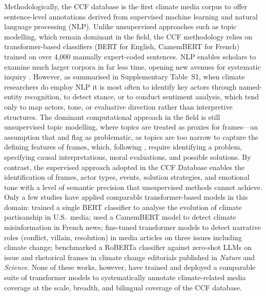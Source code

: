 \documentclass[12pt]{article}
\renewcommand\_{\texttt{\detokenize{_}\allowbreak}}
\begin{document}
Methodologically, the CCF database is the first climate media corpus to offer sentence-level annotations derived from supervised machine learning and natural language processing (NLP). Unlike unsupervised approaches such as topic modelling, which remain dominant in the field, the CCF methodology relies on transformer-based classifiers (BERT for English, CamemBERT for French) trained on over 4,000 manually expert-coded sentences. NLP enables scholars to examine much larger corpora in far less time, opening new avenues for systematic inquiry \autocite{swarnakar_nlp_2021, schafer_computational_2023, hirsbrunner_computational_2024}. However, as summarised in Supplementary Table~S1, when climate researchers do employ NLP it is most often to identify key actors through named-entity recognition, to detect stance, or to conduct sentiment analysis, which tend only to map actors, tone, or evaluative direction rather than interpretive structures. The dominant computational approach in the field is still unsupervised topic modelling, where topics are treated as proxies for frames---an assumption that \textcite{nicholls_computational_2024} and \textcite{otmakhova_media_2024} flag as problematic, as topics are too narrow to capture the defining features of frames, which, following \textcite{entman_framing_1993}, require identifying a problem, specifying causal interpretations, moral evaluations, and possible solutions. By contrast, the supervised approach adopted in the CCF Database enables the identification of frames, actor types, events, solution strategies, and emotional tone with a level of semantic precision that unsupervised methods cannot achieve. Only a few studies have applied comparable transformer-based models in this domain: \textcite{luo_detecting_2021} trained a single BERT classifier to analyse the evolution of climate partisanship in U.S.\ media; \textcite{meddeb_counteracting_2022} used a CamemBERT model to detect climate misinformation in French news; \textcite{frermann_conflicts_2023} fine-tuned transformer models to detect narrative roles (conflict, villain, resolution) in media articles on three issues including climate change; \textcite{badullovich_manual_2026} benchmarked a RoBERTa classifier against zero-shot LLMs on issue and rhetorical frames in climate change editorials published in \textit{Nature} and \textit{Science}. None of these works, however, have trained and deployed a comparable suite of transformer models to systematically annotate climate-related media coverage at the scale, breadth, and bilingual coverage of the CCF database.
\end{document}
